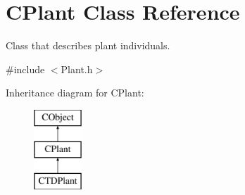 \hypertarget{class_c_plant}{}\section{C\+Plant Class Reference}
\label{class_c_plant}


Class that describes plant individuals.  




{\ttfamily \#include $<$Plant.\+h$>$}

Inheritance diagram for C\+Plant\+:\begin{figure}[H]
\begin{center}
\leavevmode
\includegraphics[height=3.000000cm]{class_c_plant}
\end{center}
\end{figure}
